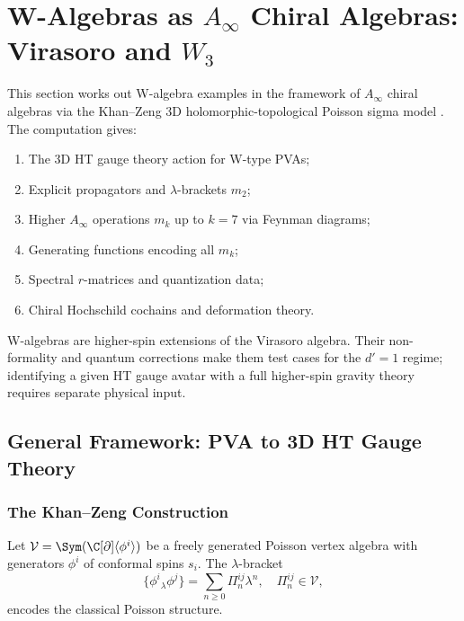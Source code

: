 \section{W-Algebras as $A_\infty$ Chiral Algebras: Virasoro and $W_3$}

This section works out W-algebra examples in the framework of $A_\infty$ chiral algebras via the Khan--Zeng 3D holomorphic-topological Poisson sigma model \cite{KZ25}. The computation gives:
\begin{enumerate}[label=(\roman*)]
\item The 3D HT gauge theory action for W-type PVAs;
\item Explicit propagators and $\lambda$-brackets $m_2$;
\item Higher $A_\infty$ operations $m_k$ up to $k=7$ via Feynman diagrams;
\item Generating functions encoding all $m_k$;
\item Spectral $r$-matrices and quantization data;
\item Chiral Hochschild cochains and deformation theory.
\end{enumerate}

W-algebras are higher-spin extensions of the Virasoro algebra. Their
non-formality and quantum corrections make them test cases for the
$d'=1$ regime; identifying a given HT gauge avatar with a full
higher-spin gravity theory requires separate physical input.

\subsection{General Framework: PVA to 3D HT Gauge Theory}

\subsubsection{The Khan--Zeng Construction}

Let $\mathcal{V} = \Sym(\C[\partial]\langle \phi^i \rangle)$ be a freely generated Poisson vertex algebra with generators $\phi^i$ of conformal spins $s_i$. The $\lambda$-bracket
\[
\{\phi^i{}_\lambda \phi^j\} = \sum_{n \geq 0} \Pi^{ij}_n \lambda^n, \quad \Pi^{ij}_n \in \mathcal{V},
\]
encodes the classical Poisson structure.

